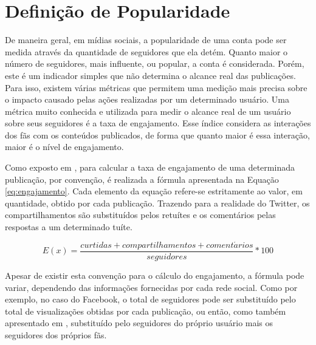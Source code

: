 \documentclass[oneside,openright,12pt]{ufsm_2015} %
\begin{document}

\section{Definição de Popularidade}
\label{sec:prop-def-popularidade}

    \par De maneira geral, em mídias sociais, a popularidade de uma conta pode ser medida através da quantidade de seguidores que ela detém. Quanto maior o número de seguidores, mais influente, ou popular, a conta é considerada. Porém, este é um indicador simples que não determina o alcance real das publicações. Para isso, existem várias métricas que permitem uma medição mais precisa sobre o impacto causado pelas ações realizadas por um determinado usuário. Uma métrica muito conhecida e utilizada para medir o alcance real de um usuário sobre seus seguidores é a taxa de engajamento. Esse índice considera as interações dos fãs com os conteúdos publicados, de forma que quanto maior é essa interação, maior é o nível de engajamento.

    \par Como exposto em \cite{pillat:17}, para calcular a taxa de engajamento de uma determinada publicação, por convenção, é realizada a fórmula apresentada na Equação \ref{eq:engajamento}. Cada elemento da equação refere-se estritamente ao valor, em quantidade, obtido por cada publicação. Trazendo para a realidade do Twitter, os compartilhamentos são substituídos pelos retuítes e os comentários pelas respostas a um determinado tuíte.
    
    \begin{equation} \label{eq:engajamento}
    E(x) = \frac{curtidas + compartilhamentos + coment\acute{a}rios}{seguidores}*100
    \end{equation}
    
    \par Apesar de existir esta convenção para o cálculo do engajamento, a fórmula pode variar, dependendo das informações fornecidas por cada rede social. Como por exemplo, no caso do Facebook, o total de seguidores pode ser substituído pelo total de visualizações obtidas por cada publicação, ou então, como também apresentado em \cite{pillat:17}, substituído pelo seguidores do próprio usuário mais os seguidores dos próprios fãs.

\end{document}
